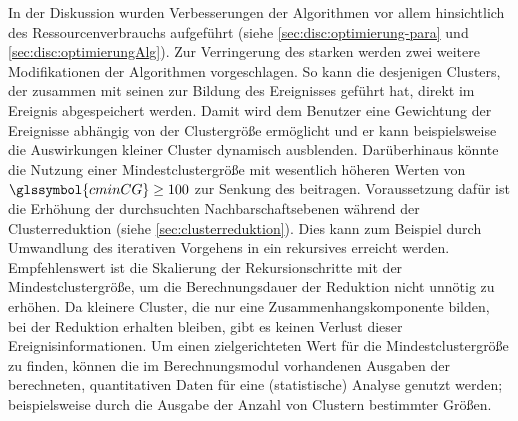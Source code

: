 In der Diskussion wurden Verbesserungen der Algorithmen vor allem hinsichtlich des Ressourcenverbrauchs aufgeführt (siehe \autoref{sec:disc:optimierung-para} und \autoref{sec:disc:optimierungAlg}). Zur Verringerung des starken  werden zwei weitere Modifikationen der Algorithmen vorgeschlagen. So kann die  desjenigen Clusters, der zusammen mit seinen  zur Bildung des Ereignisses geführt hat, direkt im Ereignis abgespeichert werden. Damit wird dem Benutzer eine Gewichtung der Ereignisse abhängig von der Clustergröße ermöglicht und er kann beispielsweise die Auswirkungen kleiner Cluster dynamisch ausblenden.
Darüberhinaus könnte die Nutzung einer Mindestclustergröße mit wesentlich höheren Werten von $\glssymbol{cminCG}\ge 100$ zur Senkung des  beitragen. Voraussetzung dafür ist die Erhöhung der durchsuchten Nachbarschaftsebenen während der Clusterreduktion (siehe \autoref{sec:clusterreduktion}). Dies kann zum Beispiel durch Umwandlung des iterativen Vorgehens in ein rekursives erreicht werden. Empfehlenswert ist die Skalierung der Rekursionschritte mit der Mindestclustergröße, um die Berechnungsdauer der Reduktion nicht unnötig zu erhöhen. Da kleinere Cluster, die nur eine Zusammenhangskomponente bilden, bei der Reduktion erhalten bleiben, gibt es keinen Verlust dieser Ereignisinformationen.
Um einen zielgerichteten Wert für die Mindestclustergröße zu finden, können die im Berechnungsmodul vorhandenen Ausgaben der berechneten, quantitativen Daten für eine (statistische) Analyse genutzt werden; beispielsweise durch die Ausgabe der Anzahl von Clustern bestimmter Größen.


